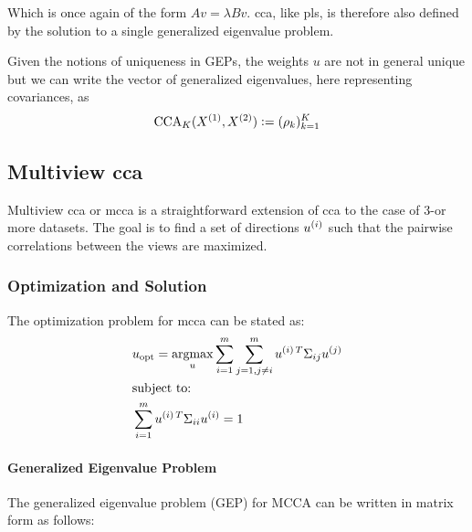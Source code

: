 Which is once again of the form $A v = \lambda B v$. \acrshort{cca}, like \acrshort{pls}, is therefore also defined by the solution to a single generalized eigenvalue problem.

Given the notions of uniqueness in GEPs, the weights $u$ are not in general unique but we can write the vector of generalized eigenvalues, here representing covariances, as
\begin{align}
    \label{eq:cca-vector-of-correlations-def}\small
    \operatorname{CCA}_K(X^{(1)},X^{(2)}) \vcentcolon= (\rho_k)_{k=1}^K
\end{align}

\subsection{Multiview \acrshort{cca}}

Multiview \acrshort{cca} or \acrshort{mcca} is a straightforward extension of \acrshort{cca} to the case of 3-or more datasets.
The goal is to find a set of directions \(u^{(i)}\) such that the pairwise correlations between the views are maximized.

\subsubsection{Optimization and Solution}

The optimization problem for \acrshort{mcca} can be stated as:
\begin{align}
    & u_{\text{opt}} = \underset{u}{\mathrm{argmax}} \sum_{i=1}^{m} \sum_{j=1, j \neq i}^{m} u^{(i)\,T} \Sigma_{ij} u^{(j)} \\
    & \text{subject to:} \notag                                                                                               \\
    & \sum_{i=1}^{m} u^{(i)\,T} \Sigma_{ii} u^{(i)} = 1 \notag
\end{align}

\paragraph{Generalized Eigenvalue Problem}

The generalized eigenvalue problem (GEP) for MCCA can be written in matrix form as follows:

